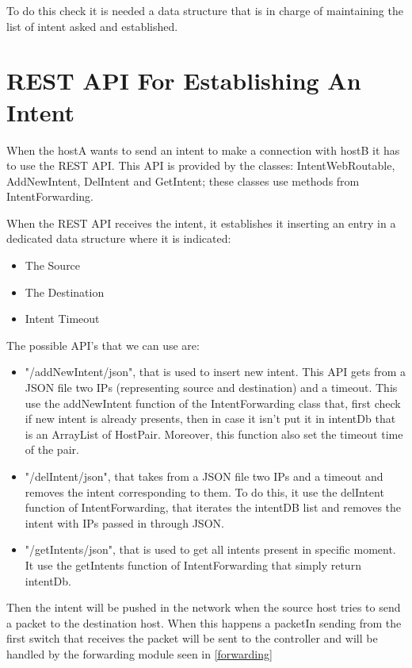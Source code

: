 \documentclass[a4paper]{report}
\begin{document}
	\noindent To do this check it is needed a data structure that is in charge of maintaining the list of intent asked and established.
	
	\section{REST API For Establishing An Intent}
	\noindent When the hostA wants to send an intent to make a connection with hostB it has to use the REST API. This API is provided by the classes: IntentWebRoutable, AddNewIntent, DelIntent and GetIntent; these classes use methods from IntentForwarding.
	
	\noindent When the REST API receives the intent, it establishes it inserting an entry in a dedicated data structure where it is indicated:
	\begin{itemize}
	\item The Source
	\item The Destination
	\item Intent Timeout
	\end{itemize}

	\noindent The possible API’s that we can use are:
        \begin{itemize}
        \item "/addNewIntent/json", that is used to insert new intent. This API gets from a JSON file two IPs (representing source and destination) and a timeout. This use the addNewIntent function of the IntentForwarding class that, first check if new intent is already presents, then in case it isn’t put it in intentDb that is an ArrayList of HostPair. Moreover, this function also set the timeout time of the pair.
        \item "/delIntent/json", that takes from a JSON file two IPs and a timeout and removes the intent corresponding to them. To do this, it use the delIntent function of IntentForwarding, that iterates the intentDB list and removes the intent with IPs passed in through JSON.
	\item "/getIntents/json", that is used to get all intents present in specific moment. It use the getIntents function of IntentForwarding that simply return intentDb.
        \end{itemize}

	
	
	\noindent Then the intent will be pushed in the network when the source host tries to send a packet to the destination host. When this happens a packetIn sending from the first switch that receives the packet will be sent to the controller and will be handled by the forwarding module seen in \ref{forwarding}
	
\end{document}
